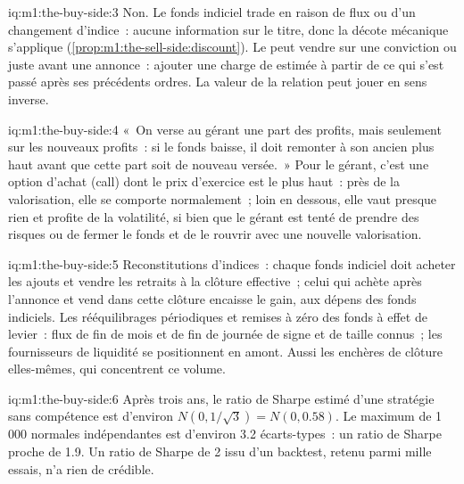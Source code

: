 \begin{solution}{iq:m1:the-buy-side:3}
Non. Le fonds indiciel trade en raison de flux ou d'un changement
d'indice~: aucune information sur le titre, donc la décote mécanique s'applique
(\cref{prop:m1:the-sell-side:discount}). Le  peut vendre sur
une conviction ou juste avant une annonce~: ajouter une charge de 
estimée à partir de ce qui s'est passé après ses précédents ordres. La valeur
de la relation peut jouer en sens inverse.
\end{solution}

\begin{solution}{iq:m1:the-buy-side:4}
«~On verse au gérant une part des profits, mais seulement sur les nouveaux profits~: si le
fonds baisse, il doit remonter à son ancien plus haut avant que cette part
soit de nouveau versée.~» Pour le gérant, c'est une option d'achat (call) dont le prix
d'exercice est le plus haut~: près de la valorisation, elle se comporte normalement~; loin en dessous, elle
vaut presque rien et profite de la volatilité, si bien que le gérant est tenté de prendre des risques ou de fermer le
fonds et de le rouvrir avec une nouvelle valorisation.
\end{solution}

\begin{solution}{iq:m1:the-buy-side:5}
Reconstitutions d'indices~: chaque fonds indiciel doit acheter les ajouts et vendre les retraits
à la clôture effective~; celui qui achète après l'annonce et vend dans
cette clôture encaisse le gain, aux dépens des fonds indiciels. Les rééquilibrages périodiques
et remises à zéro des fonds à effet de levier~: flux de fin de mois et de fin de journée
de signe et de taille connus~; les fournisseurs de liquidité se positionnent en amont. Aussi
les enchères de clôture elles-mêmes, qui concentrent ce volume.
\end{solution}

\begin{solution}{iq:m1:the-buy-side:6}
Après trois ans, le ratio de Sharpe estimé d'une stratégie sans compétence est d'environ
$N(0, 1/\sqrt3) = N(0, 0.58)$. Le maximum de 1\,000 normales indépendantes est
d'environ 3.2 écarts-types~: un ratio de Sharpe proche de 1.9. Un
ratio de Sharpe de 2 issu d'un backtest, retenu parmi mille essais, n'a rien de crédible.
\end{solution}
